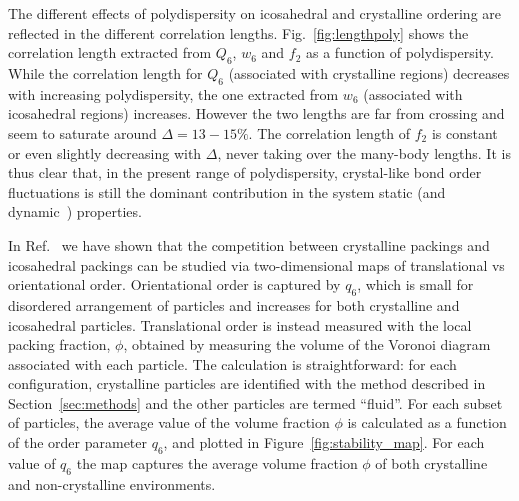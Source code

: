 \documentclass[twocolumn,superscriptaddress]{revtex4}
\begin{document}
The different effects of polydispersity on icosahedral and crystalline ordering are reflected in the different correlation lengths.
Fig.~\ref{fig:lengthpoly} shows the correlation length extracted from $Q_6$, $w_6$ and $f_2$ as a function of polydispersity. While the correlation length for $Q_6$ (associated with crystalline regions) decreases with increasing polydispersity, the one extracted from $w_6$ (associated with icosahedral regions) increases.
However the two lengths are far from crossing and seem to saturate around $\Delta=13-15\%$. The correlation length of $f_2$ is constant or even slightly decreasing with $\Delta$, never taking over the many-body lengths. It is thus clear that, in the present range of polydispersity, crystal-like bond order fluctuations is still the dominant contribution in the system static (and dynamic~\cite{mathieu_icosahedra}) properties.

In Ref.~\cite{russo_hs} we have shown that the competition between crystalline packings and
icosahedral packings can be studied via two-dimensional maps of translational vs orientational order.
Orientational order is captured by $q_6$, which is small for disordered arrangement of particles and
increases for both crystalline and icosahedral particles. Translational order is instead measured with
the local packing fraction, $\phi$, obtained by measuring the volume of the Voronoi diagram associated with
each particle. The calculation is straightforward: for each
configuration, crystalline particles are identified with the method described in Section~\ref{sec:methods} and the other particles are termed ``fluid''. For each subset of particles, the average value of the volume fraction $\phi$ is calculated as a function of the order parameter $q_6$, and plotted in Figure~\ref{fig:stability_map}.
For each value of $q_6$ the map captures the average volume fraction $\phi$ of both crystalline and non-crystalline
environments.
\end{document}
